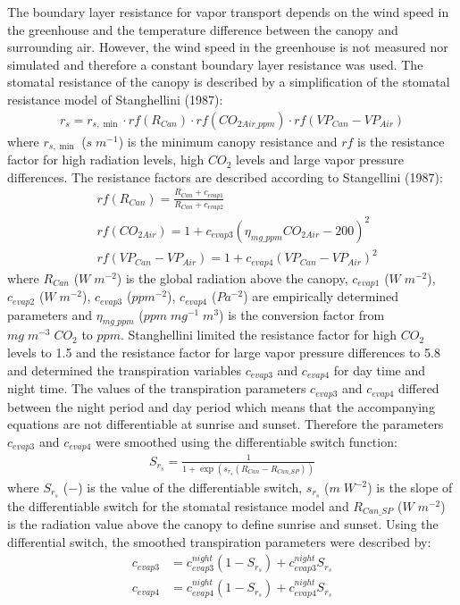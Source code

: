 \documentclass[a4paper]{article}
\begin{document}
The boundary layer resistance for vapor transport depends on the wind speed in the greenhouse and the temperature difference between the canopy and surrounding air\cite{stanghellini1987transpiration}.
However, the wind speed in the greenhouse is not measured nor simulated and therefore a constant boundary layer resistance was used.
The stomatal resistance of the canopy is described by a simplification of the stomatal resistance model of Stanghellini (1987):
\begin{align}
  r_s = r_{s,\min} \cdot rf(R_{Can}) \cdot rf(CO_{2Air\_ppm}) \cdot rf(VP_{Can} - VP_{Air})
\end{align}
where \(r_{s,\min}\) (\(s\;m^{-1}\)) is the minimum canopy resistance and \(rf\) is the resistance factor for high radiation levels, high \(CO_2\) levels and large vapor pressure differences.
The resistance factors are described according to Stangellini (1987):
\begin{equation}
  \begin{split}
    & rf(R_{Can}) = \frac{R_{Can} + c_{evap1}}{R_{Can} + c_{evap2}} \\
    & rf(CO_{2Air}) = 1 + {c_{evap3} (\eta_{mg\_ppm} CO_{2Air} - 200)}^2 \\
    & rf(VP_{Can} - VP_{Air}) = 1 + {c_{evap4} (VP_{Can} - VP_{Air})}^2
  \end{split}
\end{equation}
where \(R_{Can}\) (\(W\;m^{-2}\)) is the global radiation above the canopy, \(c_{evap1}\) (\(W\;m^{-2}\)), \(c_{evap2}\) (\(W\;m^{-2}\)), \(c_{evap3}\) (\(ppm^{-2}\)), \(c_{evap4}\) (\(Pa^{-2}\)) are empirically determined parameters and \(\eta_{mg\_ppm}\) (\(ppm\;mg^{-1}\;m^3\)) is the conversion factor from \(mg\;m^{-3}\;CO_2\) to \(ppm\).
Stanghellini limited the resistance factor for high \(CO_2\) levels to 1.5 and the resistance factor for large vapor pressure differences to 5.8 and determined the transpiration variables \(c_{evap3}\) and \(c_{evap4}\) for day time and night time.
The values of the transpiration parameters \(c_{evap3}\) and \(c_{evap4}\) differed between the night period and day period which means that the accompanying equations are not differentiable at sunrise and sunset. Therefore the parameters \(c_{evap3}\) and \(c_{evap4}\) were smoothed using the differentiable switch function:
\begin{align}
  S_{r_s} = \frac{1}{1 + \exp \left(s_{r_s} (R_{Can} - R_{Can\_SP})\right)}
\end{align}
where \(S_{r_s}\) (\(-\)) is the value of the differentiable switch, \(s_{r_s}\) (\(m\;W^{-2}\)) is the slope of the differentiable switch for the stomatal resistance model and \(R_{Can\_SP}\) (\(W\;m^{-2}\)) is the radiation value above the canopy to define sunrise and sunset.
Using the differential switch, the smoothed transpiration parameters were described by:
\begin{align}
  c_{evap3} & = c_{evap3}^{night} (1 - S_{r_s}) + c_{evap3}^{night} S_{r_s} \\
  c_{evap4} & = c_{evap4}^{night} (1 - S_{r_s}) + c_{evap4}^{night} S_{r_s}
\end{align}
\end{document}
